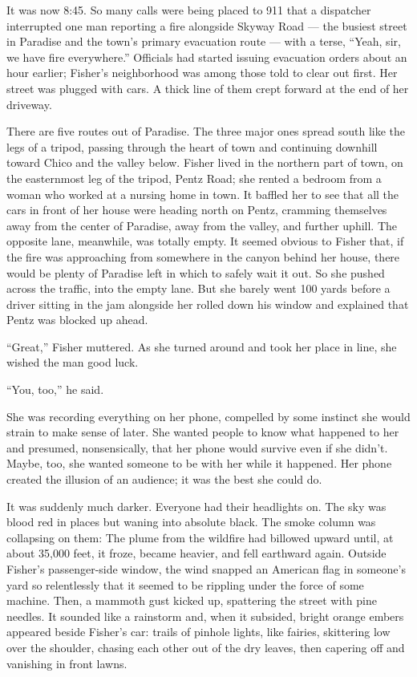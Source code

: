 It was now 8:45. So many calls were being placed to 911 that a
dispatcher interrupted one man reporting a fire alongside Skyway Road
--- the busiest street in Paradise and the town's primary evacuation
route --- with a terse, ``Yeah, sir, we have fire everywhere.''
Officials had started issuing evacuation orders about an hour earlier;
Fisher's neighborhood was among those told to clear out first. Her
street was plugged with cars. A thick line of them crept forward at the
end of her driveway.

There are five routes out of Paradise. The three major ones spread south
like the legs of a tripod, passing through the heart of town and
continuing downhill toward Chico and the valley below. Fisher lived in
the northern part of town, on the easternmost leg of the tripod, Pentz
Road; she rented a bedroom from a woman who worked at a nursing home in
town. It baffled her to see that all the cars in front of her house were
heading north on Pentz, cramming themselves away from the center of
Paradise, away from the valley, and further uphill. The opposite lane,
meanwhile, was totally empty. It seemed obvious to Fisher that, if the
fire was approaching from somewhere in the canyon behind her house,
there would be plenty of Paradise left in which to safely wait it out.
So she pushed across the traffic, into the empty lane. But she barely
went 100 yards before a driver sitting in the jam alongside her rolled
down his window and explained that Pentz was blocked up ahead.

``Great,'' Fisher muttered. As she turned around and took her place in
line, she wished the man good luck.

``You, too,'' he said.

She was recording everything on her phone, compelled by some instinct
she would strain to make sense of later. She wanted people to know what
happened to her and presumed, nonsensically, that her phone would
survive even if she didn't. Maybe, too, she wanted someone to be with
her while it happened. Her phone created the illusion of an audience; it
was the best she could do.

It was suddenly much darker. Everyone had their headlights on. The sky
was blood red in places but waning into absolute black. The smoke column
was collapsing on them: The plume from the wildfire had billowed upward
until, at about 35,000 feet, it froze, became heavier, and fell
earthward again. Outside Fisher's passenger-side window, the wind
snapped an American flag in someone's yard so relentlessly that it
seemed to be rippling under the force of some machine. Then, a mammoth
gust kicked up, spattering the street with pine needles. It sounded like
a rainstorm and, when it subsided, bright orange embers appeared beside
Fisher's car: trails of pinhole lights, like fairies, skittering low
over the shoulder, chasing each other out of the dry leaves, then
capering off and vanishing in front lawns.

